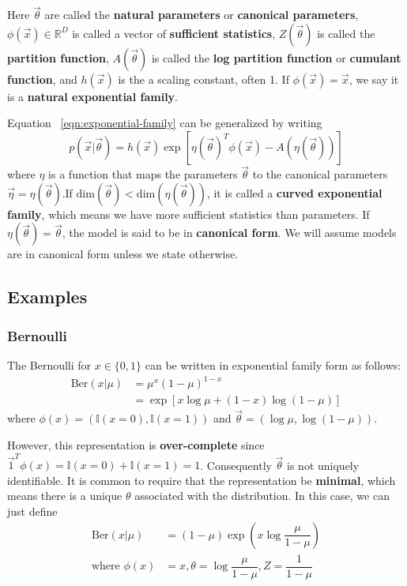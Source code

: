 Here $\vec{\theta}$ are called the \textbf{natural parameters} or \textbf{canonical parameters}, $\phi(\vec{x}) \in \mathbb{R}^D$ is called a vector of \textbf{sufficient statistics}, $Z(\vec{\theta})$ is called the \textbf{partition function}, $A(\vec{\theta})$ is called the \textbf{log partition function} or \textbf{cumulant function}, and $h(\vec{x})$ is the a scaling constant, often 1. If $\phi(\vec{x})=\vec{x}$, we say it is a \textbf{natural exponential family}.

Equation ~\eqref{eqn:exponential-family} can be generalized by writing
\begin{equation}
p(\vec{x}|\vec{\theta}) = h(\vec{x})\exp[\eta(\vec{\theta})^T\phi(\vec{x})-A(\eta(\vec{\theta}))]
\end{equation}
where $\eta$ is a function that maps the parameters $\vec{\theta}$ to the canonical parameters $\vec{\eta}=\eta(\vec{\theta})$.If $\mathrm{dim}(\vec{\theta})<\mathrm{dim}(\eta(\vec{\theta}))$, it is called a \textbf{curved exponential family}, which means we have more sufficient statistics than parameters. If $\eta(\vec{\theta})=\vec{\theta}$, the model is said to be in \textbf{canonical form}. We will assume models are in canonical form unless we state otherwise.


\subsection{Examples}


\subsubsection{Bernoulli}
The Bernoulli for $x \in \{0,1\}$ can be written in exponential family form as follows:
\begin{equation}\begin{split}
\mathrm{Ber}(x|\mu)& =\mu^x(1-\mu)^{1-x} \\
   & =\exp[x\log\mu+(1-x)\log(1-\mu)]
\end{split}\end{equation}
where $\phi(x)=(\mathbb{I}(x=0),\mathbb{I}(x=1))$ and $\vec{\theta}=(\log\mu,\log(1-\mu))$. 

However, this representation is \textbf{over-complete} since $\vec{1}^T\phi(x)=\mathbb{I}(x=0)+\mathbb{I}(x=1)=1$. Consequently $\vec{\theta}$ is not uniquely identifiable. It is common to require that the representation be \textbf{minimal}, which means there is a unique $\theta$ associated with the distribution. In this case, we can just define
\begin{align}
\mathrm{Ber}(x|\mu) & =(1-\mu)\exp\left(x\log\dfrac{\mu}{1-\mu}\right) \\
\text{where } \phi(x) & =x, \theta=\log\dfrac{\mu}{1-\mu}, Z=\dfrac{1}{1-\mu}  \nonumber
\end{align}

